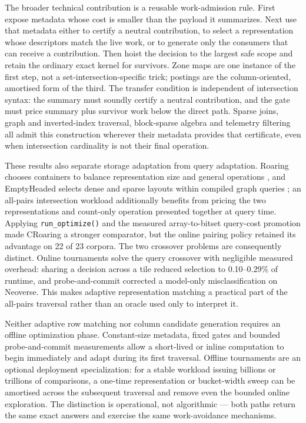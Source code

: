 The broader technical contribution is a reusable work-admission rule. First expose metadata whose
cost is smaller than the payload it summarizes. Next use that metadata either to certify a neutral
contribution, to select a representation whose descriptors match the live work, or to generate only
the consumers that can receive a contribution. Then hoist the decision to the largest safe scope and
retain the ordinary exact kernel for survivors. Zone maps are one instance of the first step, not a
set-intersection-specific trick; postings are the column-oriented, amortised form of the third. The
transfer condition is independent of intersection syntax: the summary must soundly certify a neutral
contribution, and the gate must price summary plus survivor work below the direct path. Sparse joins, graph and
inverted-index traversal, block-sparse algebra and telemetry filtering all admit this construction
wherever their metadata provides that certificate, even when intersection cardinality is not their
final operation.

These results also separate storage adaptation from query adaptation. Roaring chooses containers to
balance representation size and general operations \cite{chambi2016roaring,lemire2018roaring}, and
EmptyHeaded selects dense and sparse layouts within compiled graph queries
\cite{aberger2016emptyheaded,aberger2017emptyheaded}; an all-pairs intersection workload additionally
benefits from pricing the two representations and count-only operation presented together at query
time. Applying \texttt{run\_optimize()} and the measured array-to-bitset query-cost promotion made
CRoaring a stronger comparator, but the online pairing policy retained its advantage on 22 of 23
corpora. The two crossover problems are consequently distinct. Online tournaments solve the query
crossover with negligible measured overhead: sharing a decision across a tile reduced selection to
0.10--0.29\% of runtime, and probe-and-commit corrected a model-only misclassification on Neoverse.
This makes adaptive representation matching a practical part of the all-pairs traversal rather than
an oracle used only to interpret it.

Neither adaptive row matching nor column candidate generation requires an offline optimization
phase. Constant-size metadata, fixed gates and bounded probe-and-commit measurements allow a
short-lived or inline computation to begin immediately and adapt during its first traversal. Offline
tournaments are an optional deployment specialization: for a stable workload issuing billions or
trillions of comparisons, a one-time representation or bucket-width sweep can be amortised across the
subsequent traversal and remove even the bounded online exploration. The distinction is operational,
not algorithmic --- both paths return the same exact answers and exercise the same work-avoidance
mechanisms.

